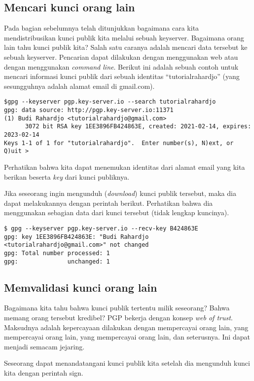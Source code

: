 \subsection{Mencari kunci orang lain}
Pada bagian sebelumnya telah ditunjukkan bagaimana cara kita mendistribusikan
kunci publik kita melalui sebuah keyserver.
Bagaimana orang lain tahu kunci publik kita? 
Salah satu caranya adalah mencari data tersebut ke sebuah keyserver.
Pencarian dapat dilakukan dengan menggunakan web atau dengan menggunakan
{\em command line}. Berikut ini adalah sebuah contoh untuk mencari informasi
kunci publik dari sebuah identitas ``tutorialrahardjo'' (yang sesungguhnya
adalah alamat email di gmail.com).

\begin{verbatim}
$gpg --keyserver pgp.key-server.io --search tutorialrahardjo
gpg: data source: http://pgp.key-server.io:11371
(1)	Budi Rahardjo <tutorialrahardjo@gmail.com>
	  3072 bit RSA key 1EE3896FB424863E, created: 2021-02-14, expires: 2023-02-14
Keys 1-1 of 1 for "tutorialrahardjo".  Enter number(s), N)ext, or Q)uit >
\end{verbatim}

Perhatikan bahwa kita dapat menemukan identitas dari alamat email yang kita berikan
beserta {\em key} dari kunci publiknya.

Jika seseorang ingin mengunduh ({\em download}) kunci publik tersebut,
maka dia dapat melakukannya dengan perintah berikut.
Perhatikan bahwa dia menggunakan sebagian data dari kunci tersebut
(tidak lengkap kuncinya).

\begin{verbatim}
$ gpg --keyserver pgp.key-server.io --recv-key B424863E
gpg: key 1EE3896FB424863E: "Budi Rahardjo <tutorialrahardjo@gmail.com>" not changed
gpg: Total number processed: 1
gpg:              unchanged: 1
\end{verbatim}


\subsection{Memvalidasi kunci orang lain}
Bagaimana kita tahu bahwa kunci publik tertentu milik seseorang?
Bahwa memang orang tersebut kredibel?
PGP bekerja dengan konsep {\em web of trust}.
Maksudnya adalah kepercayaan dilakukan dengan mempercayai orang lain,
yang mempercayai orang lain, yang mempercayai orang lain, dan seterusnya.
Ini dapat menjadi semacam jejaring.

Seseorang dapat menandatangani kunci publik kita setelah dia mengunduh kunci kita
dengan perintah sign.

